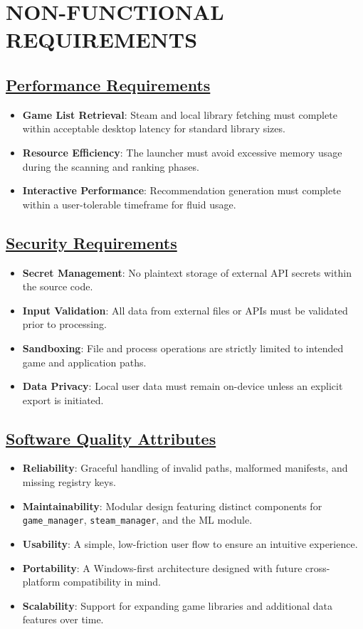 \section{NON-FUNCTIONAL REQUIREMENTS}

\subsection{\underline{Performance Requirements}}
\begin{itemize}
    \item \textbf{Game List Retrieval}: Steam and local library fetching must complete within acceptable desktop latency for standard library sizes.
    \item \textbf{Resource Efficiency}: The launcher must avoid excessive memory usage during the scanning and ranking phases.
    \item \textbf{Interactive Performance}: Recommendation generation must complete within a user-tolerable timeframe for fluid usage.
\end{itemize}

\subsection{\underline{Security Requirements}}
\begin{itemize}
    \item \textbf{Secret Management}: No plaintext storage of external API secrets within the source code.
    \item \textbf{Input Validation}: All data from external files or APIs must be validated prior to processing.
    \item \textbf{Sandboxing}: File and process operations are strictly limited to intended game and application paths.
    \item \textbf{Data Privacy}: Local user data must remain on-device unless an explicit export is initiated.
\end{itemize}

\subsection{\underline{Software Quality Attributes}}
\begin{itemize}
    \item \textbf{Reliability}: Graceful handling of invalid paths, malformed manifests, and missing registry keys.
    \item \textbf{Maintainability}: Modular design featuring distinct components for \texttt{game\_manager}, \texttt{steam\_manager}, and the ML module.
    \item \textbf{Usability}: A simple, low-friction user flow to ensure an intuitive experience.
    \item \textbf{Portability}: A Windows-first architecture designed with future cross-platform compatibility in mind.
    \item \textbf{Scalability}: Support for expanding game libraries and additional data features over time.
\end{itemize}
